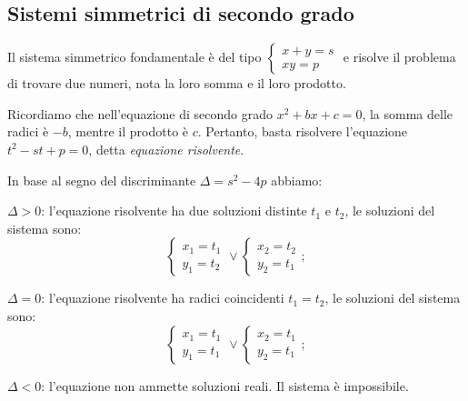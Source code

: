 \subsection{Sistemi simmetrici di secondo grado}

Il sistema simmetrico fondamentale è del tipo $\left\{\begin{array}{l}{x+y=s}\\{xy=p}\end{array}\right.$ e risolve il problema di trovare due numeri, nota la loro somma e il loro prodotto.

Ricordiamo che nell'equazione di secondo grado $x^2+bx+c=0$, la somma delle radici è $-b$, mentre il prodotto è $c$. Pertanto, basta risolvere l'equazione $t^2-st+p=0$, detta \emph{equazione risolvente}.

In base al segno del discriminante $\Delta = s^2-4p$ abbiamo:
\begin{itemize*}
\item $\Delta>0$: l'equazione risolvente ha due soluzioni distinte $t_1$ e $t_2$, le soluzioni del sistema sono: \[\left\{\begin{array}{l}{x_1=t_1}\\{y_1=t_2}\end{array}\right.\vee \left\{\begin{array}{l}{x_2=t_2}\\{y_2=t_1}\end{array}\right.;\]
\item $\Delta=0$: l'equazione risolvente ha radici coincidenti $t_1=t_2$, le soluzioni del sistema sono: \[\left\{\begin{array}{l}{x_1=t_1}\\{y_1=t_1}\end{array}\right.\vee \left\{\begin{array}{l}{x_2=t_1}\\{y_2=t_1}\end{array}\right.;\]
\item $\Delta<0$: l'equazione non ammette soluzioni reali. Il sistema è impossibile.
\end{itemize*}

